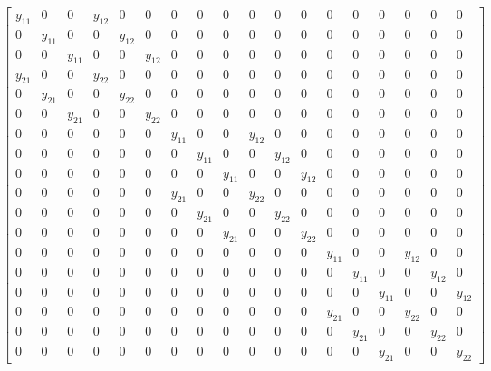 \newpage
\begin{equation*}
\left[\begin{array}{cccccccccccccccccc}y_{11} & 0 & 0 & y_{12} & 0 & 0 & 0 & 0 & 0 & 0 & 0 & 0 & 0 & 0 & 0 & 0 & 0 & 0\\0 & y_{11} & 0 & 0 & y_{12} & 0 & 0 & 0 & 0 & 0 & 0 & 0 & 0 & 0 & 0 & 0 & 0 & 0\\0 & 0 & y_{11} & 0 & 0 & y_{12} & 0 & 0 & 0 & 0 & 0 & 0 & 0 & 0 & 0 & 0 & 0 & 0\\y_{21} & 0 & 0 & y_{22} & 0 & 0 & 0 & 0 & 0 & 0 & 0 & 0 & 0 & 0 & 0 & 0 & 0 & 0\\0 & y_{21} & 0 & 0 & y_{22} & 0 & 0 & 0 & 0 & 0 & 0 & 0 & 0 & 0 & 0 & 0 & 0 & 0\\0 & 0 & y_{21} & 0 & 0 & y_{22} & 0 & 0 & 0 & 0 & 0 & 0 & 0 & 0 & 0 & 0 & 0 & 0\\0 & 0 & 0 & 0 & 0 & 0 & y_{11} & 0 & 0 & y_{12} & 0 & 0 & 0 & 0 & 0 & 0 & 0 & 0\\0 & 0 & 0 & 0 & 0 & 0 & 0 & y_{11} & 0 & 0 & y_{12} & 0 & 0 & 0 & 0 & 0 & 0 & 0\\0 & 0 & 0 & 0 & 0 & 0 & 0 & 0 & y_{11} & 0 & 0 & y_{12} & 0 & 0 & 0 & 0 & 0 & 0\\0 & 0 & 0 & 0 & 0 & 0 & y_{21} & 0 & 0 & y_{22} & 0 & 0 & 0 & 0 & 0 & 0 & 0 & 0\\0 & 0 & 0 & 0 & 0 & 0 & 0 & y_{21} & 0 & 0 & y_{22} & 0 & 0 & 0 & 0 & 0 & 0 & 0\\0 & 0 & 0 & 0 & 0 & 0 & 0 & 0 & y_{21} & 0 & 0 & y_{22} & 0 & 0 & 0 & 0 & 0 & 0\\0 & 0 & 0 & 0 & 0 & 0 & 0 & 0 & 0 & 0 & 0 & 0 & y_{11} & 0 & 0 & y_{12} & 0 & 0\\0 & 0 & 0 & 0 & 0 & 0 & 0 & 0 & 0 & 0 & 0 & 0 & 0 & y_{11} & 0 & 0 & y_{12} & 0\\0 & 0 & 0 & 0 & 0 & 0 & 0 & 0 & 0 & 0 & 0 & 0 & 0 & 0 & y_{11} & 0 & 0 & y_{12}\\0 & 0 & 0 & 0 & 0 & 0 & 0 & 0 & 0 & 0 & 0 & 0 & y_{21} & 0 & 0 & y_{22} & 0 & 0\\0 & 0 & 0 & 0 & 0 & 0 & 0 & 0 & 0 & 0 & 0 & 0 & 0 & y_{21} & 0 & 0 & y_{22} & 0\\0 & 0 & 0 & 0 & 0 & 0 & 0 & 0 & 0 & 0 & 0 & 0 & 0 & 0 & y_{21} & 0 & 0 & y_{22}\end{array}\right]
\end{equation*}

